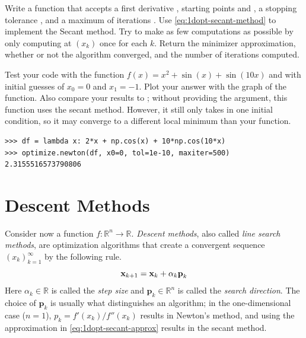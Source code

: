 \begin{problem} %
Write a function that accepts a first derivative , starting points  and , a stopping tolerance , and a maximum of iterations .
Use \eqref{eq:1dopt-secant-method} to implement the Secant method.
Try to make as few computations as possible by only computing  at $(x_k)$ once for each $k$.
Return the minimizer approximation, whether or not the algorithm converged, and the number of iterations computed.

Test your code with the function $f(x) = x^2 + \sin(x) + \sin(10x)$ and with initial guesses of $x_0 = 0$ and $x_1 = -1$.
Plot your answer with the graph of the function.
Also compare your results to ; without providing the  argument, this function uses the secant method.
However, it still only takes in one initial condition, so it may converge to a different local minimum than your function.

\begin{lstlisting}
>>> df = lambda x: 2*x + np.cos(x) + 10*np.cos(10*x)
>>> optimize.newton(df, x0=0, tol=1e-10, maxiter=500)
2.3155516573790806
\end{lstlisting}
\end{problem}

\section*{Descent Methods} %

Consider now a function $f:\mathbb{R}^n\rightarrow\mathbb{R}$.
\emph{Descent methods}, also called \emph{line search methods}, are optimization algorithms that create a convergent sequence $(x_k)_{k=1}^\infty$ by the following rule.
\begin{equation}
\mathbf{x}_{k+1} = \mathbf{x}_k + \alpha_k \textbf{p}_k
\end{equation}
Here $\alpha_k \in \mathbb{R}$ is called the \emph{step size} and $\textbf{p}_k \in \mathbb{R}^n$ is called the \emph{search direction}.
The choice of $\textbf{p}_k$ is usually what distinguishes an algorithm;
in the one-dimensional case ($n = 1$), $p_k = f'(x_k)/f''(x_k)$ results in Newton's method, and using the approximation in \eqref{eq:1dopt-secant-approx} results in the secant method.

